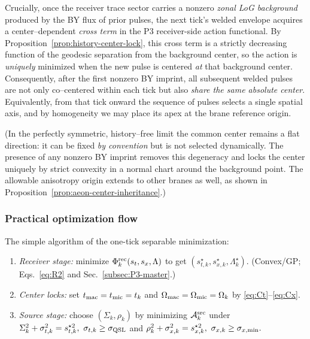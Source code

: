 \documentclass[10pt]{article}
\theoremstyle{definition}
\theoremstyle{plain}
\begin{document}
Crucially, once the receiver trace sector carries a nonzero \emph{zonal LoG background} produced by the BY
flux of prior pulses, the next tick’s welded envelope acquires a center–dependent \emph{cross term} in the
P3 receiver-side action functional. By Proposition~\ref{prop:history-center-lock}, this cross term is a strictly decreasing
function of the geodesic separation from the background center, so the action is \emph{uniquely} minimized
when the new pulse is centered \emph{at} that background center. Consequently, after the first nonzero BY imprint,
all subsequent welded pulses are not only co–centered within each tick but also \emph{share the same absolute
center}. Equivalently, from that tick onward the sequence of pulses selects a single spatial axis, and by
homogeneity we may place its apex at the brane reference origin.

(In the perfectly symmetric, history–free limit the common center remains a flat direction: it can be fixed
\emph{by convention} but is not selected dynamically. The presence of any nonzero BY imprint removes this
degeneracy and locks the center uniquely by strict convexity in a normal chart around the background point. The allowable anisotropy origin extends to other branes as well, as shown in Proposition~\ref{prop:aeon-center-inheritance}.)


\subsubsection*{Practical optimization flow}\label{subsubsec:uom-main-010}
The simple algorithm of the one-tick separable minimization:
\begin{enumerate}[leftmargin=1.4em,itemsep=2pt]
\item \emph{Receiver stage:} minimize \(\Phi^{\rm rec}_k(s_{t},s_{x},\Lambda)\) to get \((s_{t,k}^\star,s_{x,k}^\star,\Lambda_k^\star)\). (Convex/GP; Eqs.~\eqref{eq:R2} and Sec.~\ref{subsec:P3-master}.)
\item \emph{Center locks:} set \(t_{\rm mac}=t_{\rm mic}=t_k\) and \(\Omega_{\rm mac}=\Omega_{\rm mic}=\Omega_k\) by \eqref{eq:Ct}–\eqref{eq:Cx}.
\item \emph{Source stage:} choose \((\Sigma_k,\rho_k)\) by minimizing \(\mathcal A^{\rm src}_k\) under
\(
\Sigma_k^2+\sigma_{t,k}^2=s_{t,k}^{\star 2},\ \sigma_{t,k}\ge\sigma_{\rm QSL}
\)
and
\(
\rho_k^2+\sigma_{x,k}^2=s_{x,k}^{\star 2},\ \sigma_{x,k}\ge\sigma_{x,{\rm min}}.
\)
\end{enumerate}
\end{document}

